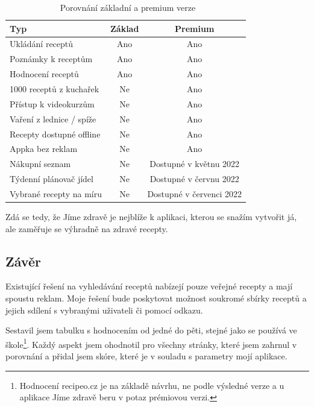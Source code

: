 \begin{table}[H]\centering
\caption{~Porovnání základní a premium verze}\label{tab:jimezdrave:zakladpremium}
\begin{tabular}{l|c|c}
    Typ		                                    & Základ    & Premium   \tabularnewline \hline
    Ukládání receptů		                    & Ano		& Ano       \tabularnewline \hline
    Poznámky k receptům	                        & Ano       & Ano       \tabularnewline \hline
    Hodnocení receptů	                        & Ano		& Ano       \tabularnewline \hline
    1000 receptů z kuchařek	                    & Ne		& Ano       \tabularnewline \hline
    Přístup k videokurzům	                    & Ne		& Ano       \tabularnewline \hline
    Vaření z lednice / spíže                    & Ne        & Ano       \tabularnewline \hline
    Recepty dostupné offline                    & Ne        & Ano       \tabularnewline \hline
    Appka bez reklam                            & Ne        & Ano       \tabularnewline \hline
    Nákupní seznam                              & Ne        & Dostupné v květnu 2022    \tabularnewline \hline
    Týdenní plánovač jídel                      & Ne        & Dostupné v červnu 2022    \tabularnewline \hline
    Vybrané recepty na míru                     & Ne        & Dostupné v červenci 2022  \tabularnewline
\end{tabular}
\end{table}

Zdá se tedy, že Jíme zdravě je nejblíže k aplikaci, kterou se snažím vytvořit já, ale zaměřuje se výhradně na zdravé recepty.

\subsection{Závěr}

Existující řešení na vyhledávání receptů nabízejí pouze veřejné recepty a mají spoustu reklam. Moje řešení bude poskytovat
možnost soukromé sbírky receptů a jejich sdílení s vybranými uživateli či pomocí odkazu.

Sestavil jsem tabulku s hodnocením od jedné do pěti, stejné jako se používá ve škole\footnote{Hodnocení recipeo.cz je na základě návrhu, ne podle výsledné verze a u aplikace Jíme zdravě beru v potaz prémiovou verzi.}.
Každý aspekt jsem ohodnotil pro všechny stránky, které jsem zahrnul v porovnání a přidal jsem skóre, které je v souladu s parametry mojí aplikace.

\newcommand*\rot{\rotatebox{90}}

